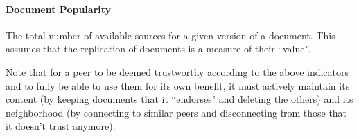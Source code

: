 \paragraph*{Document Popularity} The total number of available sources for a given version of a document. This assumes that the replication of documents is a measure of their ``value". 
    
Note that for a peer to be deemed trustworthy according to the above indicators and to fully be able to use them for its own benefit, it must actively maintain its content (by keeping documents that it ``endorses" and deleting the others) and its neighborhood (by connecting to similar peers and disconnecting from those that it doesn't trust anymore).     
